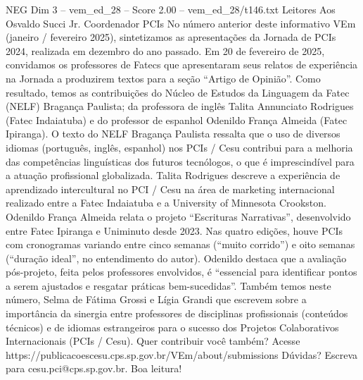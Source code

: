 \begin{textsample}{NEG Dim 3 – vem\_ed\_28 – Score 2.00 – vem\_ed\_28/t146.txt}  \label{ex:f3_neg_073}
Leitores Aos Osvaldo Succi Jr.
Coordenador PCIs No número anterior deste informativo VEm (janeiro / fevereiro 2025), sintetizamos as apresentações da Jornada de PCIs 2024, realizada em dezembro do ano passado.
Em 20 de fevereiro de 2025, convidamos os professores de Fatecs que apresentaram seus relatos de experiência na Jornada a produzirem textos para a seção “Artigo de Opinião”.
Como resultado, temos as contribuições do Núcleo de Estudos da Linguagem da Fatec (NELF) Bragança Paulista; da professora de inglês Talita Annunciato Rodrigues (Fatec Indaiatuba) e do professor de espanhol Odenildo França Almeida (Fatec Ipiranga).
O texto do NELF Bragança Paulista ressalta que o uso de diversos idiomas (português, inglês, espanhol) nos PCIs / Cesu contribui para a melhoria das competências linguísticas dos futuros tecnólogos, o que é imprescindível para a atuação profissional globalizada.
Talita Rodrigues descreve a experiência de aprendizado intercultural no PCI / Cesu na área de marketing internacional realizado entre a Fatec Indaiatuba e a University of Minnesota Crookston.
Odenildo França Almeida relata o projeto “Escrituras Narrativas”, desenvolvido entre Fatec Ipiranga e Uniminuto desde 2023.
Nas quatro edições, houve PCIs com cronogramas variando entre cinco semanas (“muito corrido”) e oito semanas (“duração ideal”, no entendimento do autor).
Odenildo destaca que a avaliação pós-projeto, feita pelos professores envolvidos, é “essencial para identificar pontos a serem ajustados e resgatar práticas bem-sucedidas”.
Também temos neste número, Selma de Fátima Grossi e Lígia Grandi que escrevem sobre a importância da sinergia entre professores de disciplinas profissionais (conteúdos técnicos) e de idiomas estrangeiros para o sucesso dos Projetos Colaborativos Internacionais (PCIs / Cesu).
Quer contribuir você também?
Acesse https://publicacoescesu.cps.sp.gov.br/VEm/about/submissions Dúvidas?
Escreva para cesu.pci@cps.sp.gov.br.
Boa leitura!

\end{textsample}
